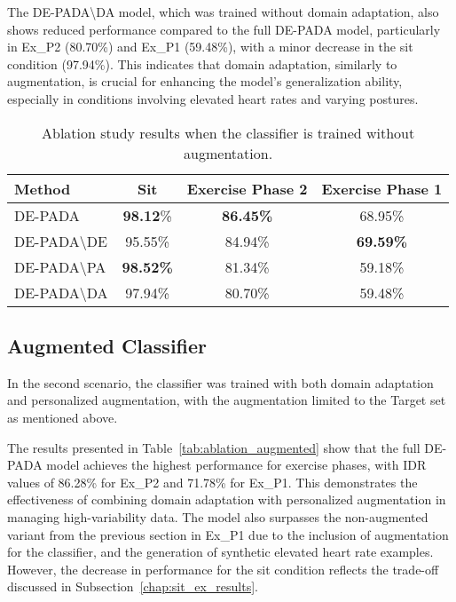 The DE-PADA\textbackslash DA model, which was trained without domain adaptation, also shows reduced performance compared to the full DE-PADA model, particularly in Ex\_P2 (80.70\%) and Ex\_P1 (59.48\%), with a minor decrease in the sit condition (97.94\%). This indicates that domain adaptation, similarly to augmentation, is crucial for enhancing the model's generalization ability, especially in conditions involving elevated heart rates and varying postures.
\begin{table}[!t]
    \centering
    \caption{Ablation study results when the classifier is trained without augmentation.}
    \label{tab:ablation_notaugmented}
    \begin{tabular}{lccc}
        \hline
        Method                   & Sit              & Exercise Phase 2  & Exercise Phase 1  \\
        \hline
        DE-PADA                  & \textbf{98.12}\% & \textbf{86.45\%} & 68.95\%          \\
        DE-PADA\textbackslash DE & 95.55\%          & 84.94\%          & \textbf{69.59\%} \\
        DE-PADA\textbackslash PA & \textbf{98.52\%} & 81.34\%          & 59.18\%          \\
        DE-PADA\textbackslash DA & 97.94\%          & 80.70\%          & 59.48\%          \\
        \hline
    \end{tabular}
\end{table}
\subsection{Augmented Classifier}
In the second scenario, the classifier was trained with both domain adaptation and personalized augmentation, with the augmentation limited to the Target set as mentioned above.

The results presented in Table~\ref{tab:ablation_augmented} show that the full DE-PADA model achieves the highest performance for exercise phases, with IDR values of 86.28\% for Ex\_P2 and 71.78\% for Ex\_P1. This demonstrates the effectiveness of combining domain adaptation with personalized augmentation in managing high-variability data. The model also surpasses the non-augmented variant from the previous section in Ex\_P1 due to the inclusion of augmentation for the classifier, and the generation of synthetic elevated heart rate examples. However, the decrease in performance for the sit condition reflects the trade-off discussed in Subsection~\ref{chap:sit_ex_results}.

